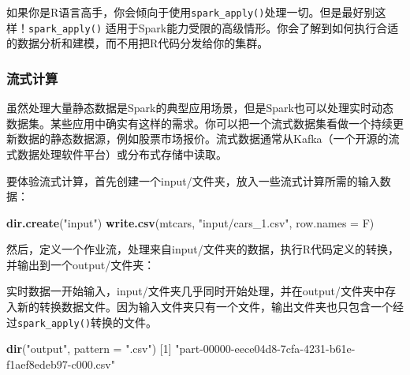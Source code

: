 \documentclass[
]{article}
\newenvironment{Shaded}{\begin{snugshade}}{\end{snugshade}}
\newcommand{\DataTypeTok}[1]{\textcolor[rgb]{0.13,0.29,0.53}{#1}}
\newcommand{\DecValTok}[1]{\textcolor[rgb]{0.00,0.00,0.81}{#1}}
\newcommand{\KeywordTok}[1]{\textcolor[rgb]{0.13,0.29,0.53}{\textbf{#1}}}
\newcommand{\NormalTok}[1]{#1}
\newcommand{\OperatorTok}[1]{\textcolor[rgb]{0.81,0.36,0.00}{\textbf{#1}}}
\newcommand{\StringTok}[1]{\textcolor[rgb]{0.31,0.60,0.02}{#1}}
\begin{document}
如果你是R语言高手，你会倾向于使用\texttt{spark\_apply()}处理一切。但是最好别这样！\texttt{spark\_apply()}
适用于Spark能力受限的高级情形。你会了解到如何执行合适的数据分析和建模，而不用把R代码分发给你的集群。

\hypertarget{ux6d41ux5f0fux8ba1ux7b97}{%
\subsubsection{流式计算}\label{ux6d41ux5f0fux8ba1ux7b97}}

虽然处理大量静态数据是Spark的典型应用场景，但是Spark也可以处理实时动态数据集。某些应用中确实有这样的需求。你可以把一个流式数据集看做一个持续更新数据的静态数据源，例如股票市场报价。流式数据通常从Kafka（一个开源的流式数据处理软件平台）或分布式存储中读取。

要体验流式计算，首先创建一个input/文件夹，放入一些流式计算所需的输入数据：

\begin{Shaded}
\begin{Highlighting}[]
\KeywordTok{dir.create}\NormalTok{(}\StringTok{"input"}\NormalTok{)}
\KeywordTok{write.csv}\NormalTok{(mtcars, }\StringTok{"input/cars_1.csv"}\NormalTok{, }\DataTypeTok{row.names =}\NormalTok{ F)}
\end{Highlighting}
\end{Shaded}

然后，定义一个作业流，处理来自input/文件夹的数据，执行R代码定义的转换，并输出到一个output/文件夹：

\begin{Shaded}
\end{Shaded}

实时数据一开始输入，input/文件夹几乎同时开始处理，并在output/文件夹中存入新的转换数据文件。因为输入文件夹只有一个文件，输出文件夹也只包含一个经过\texttt{spark\_apply()}转换的文件。

\begin{Shaded}
\begin{Highlighting}[]
\KeywordTok{dir}\NormalTok{(}\StringTok{"output"}\NormalTok{, }\DataTypeTok{pattern =} \StringTok{".csv"}\NormalTok{)}
\NormalTok{[}\DecValTok{1}\NormalTok{] }\StringTok{"part-00000-eece04d8-7cfa-4231-b61e-f1aef8edeb97-c000.csv"}
\end{Highlighting}
\end{Shaded}
\end{document}
